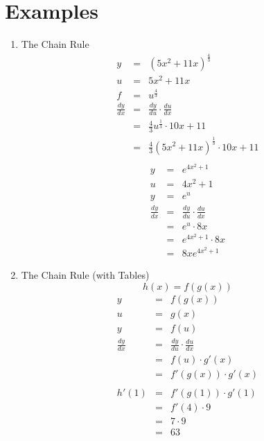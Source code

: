 \documentclass{article}
\begin{document}
\section*{Examples}
\begin{enumerate}
    \item The Chain Rule
    \begin{eqnarray}
        y &=& \left(5x^2+11x\right)^{\frac{4}{3}} \\
        u &=& 5x^2 + 11x \\
        f &=& u^{\frac{4}{3}} \\
        \frac{dy}{dx} &=& \frac{dy}{du} \cdot \frac{du}{dx} \\
                      &=& \frac{4}{3}u^{\frac{1}{3}} \cdot 10x + 11 \\
                      &=& \frac{4}{3}\left(5x^2 + 11x\right)^{\frac{1}{3}} \cdot 10x + 11 \\
    \end{eqnarray}
    \begin{eqnarray}
        y &=& e^{4x^2 + 1} \\
        u &=& 4x^2 + 1 \\
        y &=& e^u \\
        \frac{dy}{dx} &=& \frac{dy}{du} \cdot \frac{du}{dx} \\
                      &=& e^u \cdot 8x \\
                      &=& e^{4x^2 + 1} \cdot 8x \\
                      &=& 8xe^{4x^2 + 1}
    \end{eqnarray}
    \item The Chain Rule (with Tables)
    $$h(x) = f(g(x))$$
    \begin{eqnarray}
        y &=& f(g(x)) \\
        u &=& g(x) \\
        y &=& f(u) \\
        \frac{dy}{dx} &=& \frac{dy}{du} \cdot \frac{du}{dx} \\
                      &=& f(u) \cdot g'(x) \\
                      &=& f'(g(x)) \cdot g'(x) \\
                      \nonumber \\
        h'(1) &=& f'(g(1)) \cdot g'(1) \\
              &=& f'(4) \cdot 9 \\
              &=& 7 \cdot 9 \\
              &=& 63 \\

\end{eqnarray}
\end{enumerate}
\end{document}
